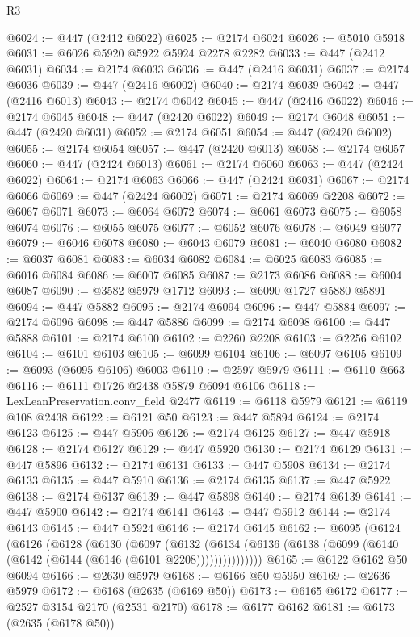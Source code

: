 \begin{lexlean}{R3}
\begin{coremodule}
@6024 := @447 (@2412 @6022)
@6025 := @2174 @6024
@6026 := @5010 @5918
@6031 := @6026 @5920 @5922 @5924 @2278 @2282
@6033 := @447 (@2412 @6031)
@6034 := @2174 @6033
@6036 := @447 (@2416 @6031)
@6037 := @2174 @6036
@6039 := @447 (@2416 @6002)
@6040 := @2174 @6039
@6042 := @447 (@2416 @6013)
@6043 := @2174 @6042
@6045 := @447 (@2416 @6022)
@6046 := @2174 @6045
@6048 := @447 (@2420 @6022)
@6049 := @2174 @6048
@6051 := @447 (@2420 @6031)
@6052 := @2174 @6051
@6054 := @447 (@2420 @6002)
@6055 := @2174 @6054
@6057 := @447 (@2420 @6013)
@6058 := @2174 @6057
@6060 := @447 (@2424 @6013)
@6061 := @2174 @6060
@6063 := @447 (@2424 @6022)
@6064 := @2174 @6063
@6066 := @447 (@2424 @6031)
@6067 := @2174 @6066
@6069 := @447 (@2424 @6002)
@6071 := @2174 @6069 @2208
@6072 := @6067 @6071
@6073 := @6064 @6072
@6074 := @6061 @6073
@6075 := @6058 @6074
@6076 := @6055 @6075
@6077 := @6052 @6076
@6078 := @6049 @6077
@6079 := @6046 @6078
@6080 := @6043 @6079
@6081 := @6040 @6080
@6082 := @6037 @6081
@6083 := @6034 @6082
@6084 := @6025 @6083
@6085 := @6016 @6084
@6086 := @6007 @6085
@6087 := @2173 @6086
@6088 := @6004 @6087
@6090 := @3582 @5979 @1712
@6093 := @6090 @1727 @5880 @5891
@6094 := @447 @5882
@6095 := @2174 @6094
@6096 := @447 @5884
@6097 := @2174 @6096
@6098 := @447 @5886
@6099 := @2174 @6098
@6100 := @447 @5888
@6101 := @2174 @6100
@6102 := @2260 @2208
@6103 := @2256 @6102
@6104 := @6101 @6103
@6105 := @6099 @6104
@6106 := @6097 @6105
@6109 := @6093 (@6095 @6106) @6003
@6110 := @2597 @5979
@6111 := @6110 @663
@6116 := @6111 @1726 @2438 @5879 @6094 @6106
@6118 := LexLeanPreservation.conv_field @2477
@6119 := @6118 @5979
@6121 := @6119 @108 @2438
@6122 := @6121 @50
@6123 := @447 @5894
@6124 := @2174 @6123
@6125 := @447 @5906
@6126 := @2174 @6125
@6127 := @447 @5918
@6128 := @2174 @6127
@6129 := @447 @5920
@6130 := @2174 @6129
@6131 := @447 @5896
@6132 := @2174 @6131
@6133 := @447 @5908
@6134 := @2174 @6133
@6135 := @447 @5910
@6136 := @2174 @6135
@6137 := @447 @5922
@6138 := @2174 @6137
@6139 := @447 @5898
@6140 := @2174 @6139
@6141 := @447 @5900
@6142 := @2174 @6141
@6143 := @447 @5912
@6144 := @2174 @6143
@6145 := @447 @5924
@6146 := @2174 @6145
@6162 := @6095
    (@6124
      (@6126
        (@6128
          (@6130
            (@6097
              (@6132
                (@6134 (@6136 (@6138 (@6099 (@6140 (@6142 (@6144 (@6146 (@6101 @2208)))))))))))))))
@6165 := @6122 @6162 @50 @6094
@6166 := @2630 @5979
@6168 := @6166 @50 @5950
@6169 := @2636 @5979
@6172 := @6168 (@2635 (@6169 @50))
@6173 := @6165 @6172
@6177 := @2527 @3154 @2170 (@2531 @2170)
@6178 := @6177 @6162
@6181 := @6173 (@2635 (@6178 @50))

\end{coremodule}
\end{lexlean}
